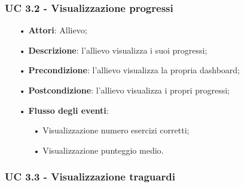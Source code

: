 \subsubsection{UC 3.2 - Visualizzazione progressi}
\begin{itemize}
\item[•]\textbf{Attori}: Allievo;
\item[•]\textbf{Descrizione}: l'allievo visualizza i suoi progressi;
\item[•]\textbf{Precondizione}: l'allievo visualizza la propria dashboard;
\item[•]\textbf{Postcondizione}: l'allievo visualizza i propri progressi;
\item[•]\textbf{Flusso degli eventi}:
\begin{itemize}
	\item[•] Visualizzazione numero esercizi corretti;
	\item[•] Visualizzazione punteggio medio.
\end{itemize}
\end{itemize}

\subsubsection{UC 3.3 - Visualizzazione traguardi}

